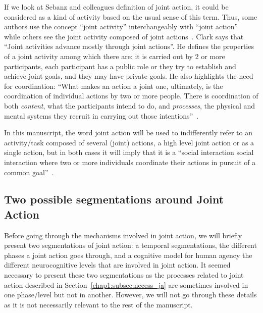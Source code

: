 \documentclass[a4paper,11pt,twoside]{StyleThese}
\begin{document}
If we look at Sebanz and colleagues definition of joint action, it could be considered as a kind of activity based on the usual sense of this term. Thus, some authors use the concept ``joint activity'' interchangeably with ``joint action''~\cite{tollefsen_2005_let,grafenhain_2013_three} while others see the joint activity composed of joint actions~\cite{clark_1996_using, feltovitch_2005_common}. Clark says that ``Joint activities advance mostly through joint actions''. He defines the properties of a joint activity among which there are: it is carried out by 2 or more participants, each participant has a public role or they try to establish and achieve joint goals, and they may have private goals. He also highlights the need for coordination: ``What makes an action a joint one, ultimately, is the coordination of individual actions by two or more people. There is coordination of both \textit{content}, what the participants intend to do, and \textit{processes}, the physical and mental systems they recruit in carrying out those intentions''~\cite[p~.59]{clark_1996_using}. 

In this manuscript, the word joint action will be used to indifferently refer to an activity/task composed of several (joint) actions, \ie a high level joint action or as a single action, but in both cases it will imply that it is a ``social interaction social interaction where two or more individuals coordinate their actions in pursuit of a common goal''~\cite{castro_2020_joint}.

\subsection{Two possible segmentations around Joint Action}

Before going through the mechanisms involved in joint action, we will briefly present two segmentations of joint action: a temporal segmentations, \ie the different phases a joint action goes through, and a cognitive model for human agency \ie the different neurocognitive levels that are involved in joint action. It seemed necessary to present these two segmentations as the processes related to joint action described in Section~\ref{chap1:subsec:necess_ja} are sometimes involved in one phase/level but not in another. However, we will not go through these details as it is not necessarily relevant to the rest of the manuscript.
\end{document}
